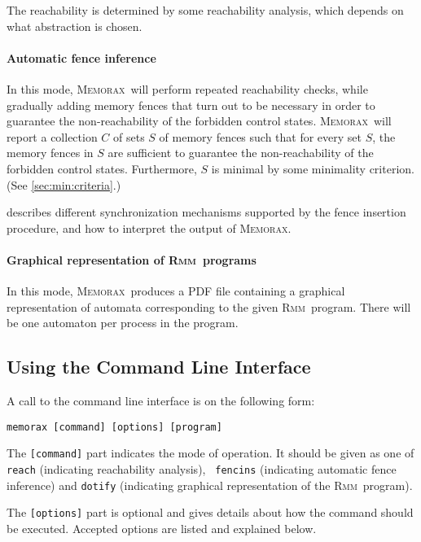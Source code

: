 \documentclass[a4paper]{article}
\newcommand{\memorax}{\textsc{Memorax}}
\newcommand{\rmm}{\textsc{Rmm}}
\newcommand{\binary}{memorax} %
\begin{document}
 The reachability is determined by some reachability analysis, which
 depends on what abstraction is chosen.

\paragraph{Automatic fence inference}
In this mode, \memorax\ will perform repeated reachability checks,
while gradually adding memory fences that turn out to be necessary in
order to guarantee the non-reachability of the forbidden control
states. \memorax\ will report a collection $C$ of sets $S$ of memory
fences such that for every set $S$, the memory fences in $S$ are
sufficient to guarantee the non-reachability of the forbidden control
states. Furthermore, $S$ is minimal by some minimality criterion. (See
\cref{sec:min:criteria}.)

 describes different synchronization mechanisms
supported by the fence insertion procedure, and how to interpret the
output of \memorax.

\paragraph{Graphical representation of \rmm\ programs}
In this mode, \memorax\ produces a PDF file containing a graphical
representation of automata corresponding to the given \rmm\
program. There will be one automaton per process in the program.

\subsection{Using the Command Line Interface}

A call to the command line interface is on the following form:

\vspace{15pt}

\noindent
{\tt \binary{} [command] [options] [program]}

\vspace{15pt}

The {\tt [command]} part indicates the mode of operation. It should be
given as one of {\tt reach} (indicating reachability analysis), {\tt
  fencins} (indicating automatic fence inference) and {\tt dotify}
(indicating graphical representation of the \rmm\ program).

The {\tt [options]} part is optional and gives details about how the
command should be executed. Accepted options are listed and explained
below.
\end{document}

